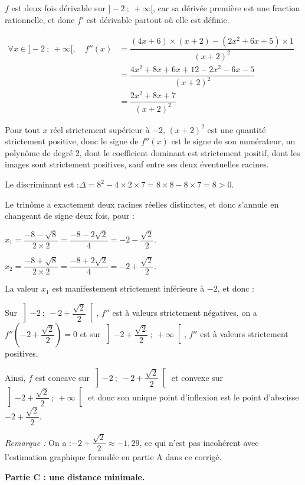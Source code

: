 \documentclass[10pt]{article}
\begin{document}
\begin{enumerate}
$f$ est deux fois dérivable sur $]-2~;~+\infty[$, car sa dérivée première est une fraction rationnelle, et donc $f'$ est dérivable partout où elle est définie.

$\begin{aligned} \forall x \in ]-2~;~+\infty[,\quad f''(x) &= \dfrac{(4x + 6)\times (x+2) - (2x^2 + 6x + 5)\times 1}{(x+2)^2}\\
&=\dfrac{4x^2+8x+6x+12-2x^2-6x-5}{(x+2)^2}\\
&=\dfrac{2x^2 +8x +7}{(x+2)^2}
\end{aligned}$

Pour tout $x$ réel strictement supérieur à $-2$, $(x+2)^2$ est une quantité strictement positive, donc le signe de $f''(x)$ est le signe de son numérateur, un polynôme de degré 2, dont le coefficient dominant est strictement positif, dont les images sont strictement positives, sauf entre ses deux éventuelles racines.

Le discriminant est :\quad $\Delta = 8^2 - 4\times 2 \times 7 = 8\times 8- 8\times 7 = 8>0$.

Le trinôme a exactement deux racines réelles distinctes, et donc s'annule en changeant de signe deux fois, pour :

$x_1 = \dfrac{-8 - \sqrt{8}}{2\times 2} = \dfrac{-8 - 2\sqrt{2}}{4} = -2 - \dfrac{\sqrt{2}}{2}$.

$x_2 = \dfrac{-8 + \sqrt{8}}{2\times 2} = \dfrac{-8 + 2\sqrt{2}}{4} = -2 + \dfrac{\sqrt{2}}{2}$.

La valeur $x_1$ est manifestement strictement inférieure à $-2$, et donc :

Sur $ \left]-2~;~-2 + \dfrac{\sqrt{2}}{2}\right[ $, $f''$ est à valeurs strictement négatives, on a $f''\left(-2 + \dfrac{\sqrt{2}}{2}\right) =0$ et sur $\left]-2 + \dfrac{\sqrt{2}}{2}~;~+\infty\right[$, $f''$ est à valeurs strictement positives.

Ainsi, $f$ est concave sur $\left]-2~;~-2 + \dfrac{\sqrt{2}}{2}\right[$ et convexe sur $\left]-2 + \dfrac{\sqrt{2}}{2}~;~+\infty\right[$ et donc son unique point d'inflexion est le point d'abscisse $-2 + \dfrac{\sqrt{2}}{2}$.

\emph{Remarque :} On a :\quad$ -2 + \dfrac{\sqrt{2}}{2}\approx-1,29$, ce qui n'est pas incohérent avec l'estimation graphique formulée en partie A dans ce corrigé.

\end{enumerate}


\textbf{Partie C : une distance minimale.}
\end{document}

